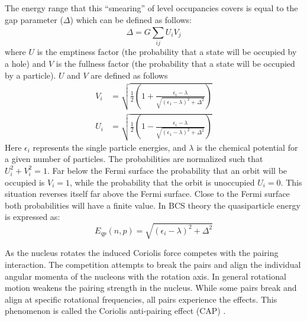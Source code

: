 The energy range that this ``smearing'' of level occupancies covers is equal to the gap parameter ($\Delta$) which can be defined as follows:
\begin{equation}
\label{eqn:chp2-pairing-gap-param}
\Delta = G\sum\limits_{ij}^{}U_iV_j
\end{equation}
where $U$ is the emptiness factor (the probability that a state will be occupied by a hole) and $V$ is the fullness factor (the probability that a state will be occupied by a particle). $U$ and $V$ are defined as follows
\begin{align}
\label{eqn:chp2-pairing-gap-param-defs}
V_i &= \sqrt{\frac{1}{2}\left(1+\frac{\epsilon_i-\lambda}{\sqrt{(\epsilon_1-\lambda)^2+\Delta^2}}\right)}\\
U_i &= \sqrt{\frac{1}{2}\left(1-\frac{\epsilon_i-\lambda}{\sqrt{(\epsilon_1-\lambda)^2+\Delta^2}}\right)}
\end{align}
Here $\epsilon_i$ represents the single particle energies, and $\lambda$ is the chemical potential for a given number of particles. The probabilities are normalized such that $U_i^2+V_i^2=1$. Far below the Fermi surface the probability that an orbit will be occupied is $V_i=1$, while the probability that the orbit is unoccupied $U_i=0$. This situation reverses itself far above the Fermi surface. Close to the Fermi surface both probabilities will have a finite value. In BCS theory \cite{bcsTheory} the quasiparticle energy is expressed as:
\begin{equation}
\label{eqn:chp2-pairing-qp-en}
E_{qp}(n,p)=\sqrt{(\epsilon_i-\lambda)^2+\Delta^2}
\end{equation}

As the nucleus rotates the induced Coriolis force competes with the pairing interaction. The competition attempts to break the pairs and align the individual angular momenta of the nucleons with the rotation axis. In general rotational motion weakens the pairing strength in the nucleus. While some pairs break and align at specific rotational frequencies, all pairs experience the effects. This phenomenon is called the Coriolis anti-pairing effect (CAP) \cite{bohrMottelsonRotationWeakensPairing}.

